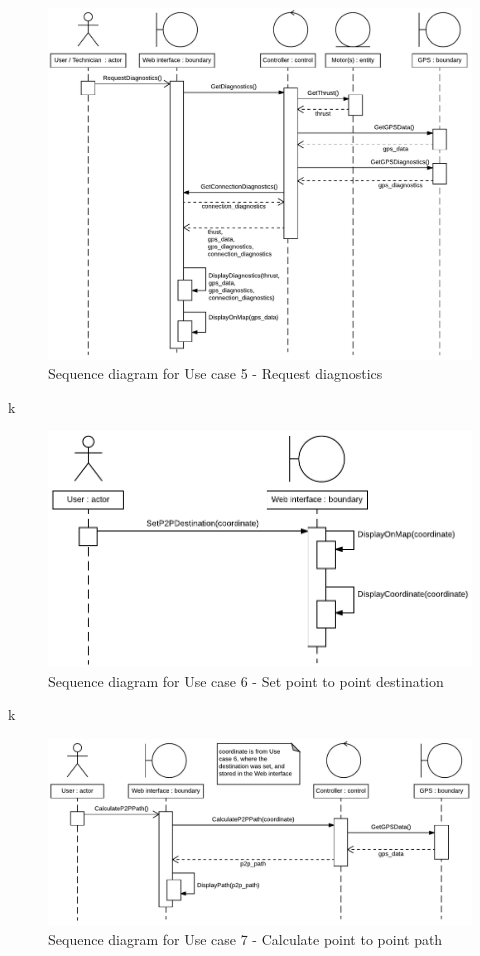 \begin{figure}[H]
	\centering
	\includegraphics[width=1\linewidth]{Images/System_architecture/Use_case_5_SD}
	\caption{Sequence diagram for Use case 5 - Request diagnostics}
\end{figure}

k

\begin{figure}[H]
	\centering
	\includegraphics[width=1\linewidth]{Images/System_architecture/Use_case_6_SD}
	\caption{Sequence diagram for Use case 6 - Set point to point destination}
\end{figure}

k

\begin{figure}[H]
	\centering
	\includegraphics[width=1\linewidth]{Images/System_architecture/Use_case_7_SD}
	\caption{Sequence diagram for Use case 7 - Calculate point to point path}
\end{figure}

